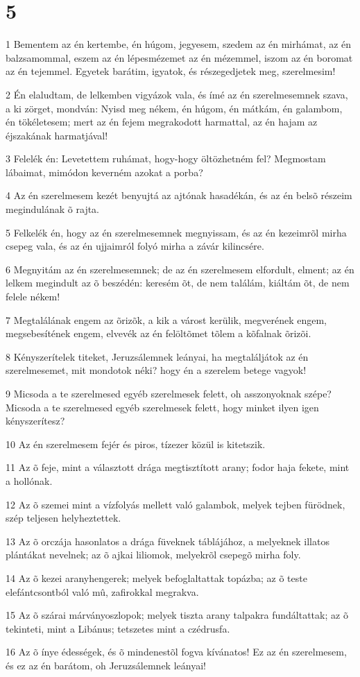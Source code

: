 \chapter{5}

\par 1 Bementem az én kertembe, én húgom, jegyesem, szedem az én mirhámat, az én balzsamommal, eszem az én lépesmézemet az én mézemmel, iszom az én boromat az én tejemmel. Egyetek barátim, igyatok, és részegedjetek meg, szerelmesim!
\par 2 Én elaludtam, de lelkemben vigyázok vala, és ímé az én szerelmesemnek szava, a ki zörget, mondván: Nyisd meg nékem, én húgom, én mátkám, én galambom, én tökéletesem; mert az én fejem megrakodott harmattal, az én hajam az éjszakának harmatjával!
\par 3 Felelék én: Levetettem ruhámat, hogy-hogy öltözhetném fel? Megmostam lábaimat, mimódon keverném azokat a porba?
\par 4 Az én szerelmesem kezét benyujtá az ajtónak hasadékán, és az én belsõ részeim megindulának õ rajta.
\par 5 Felkelék én, hogy az én szerelmesemnek megnyissam, és az én kezeimrõl mirha csepeg vala, és az én ujjaimról folyó mirha a závár kilincsére.
\par 6 Megnyitám az én szerelmesemnek; de az én szerelmesem elfordult, elment; az én lelkem megindult az õ beszédén: keresém õt, de nem találám, kiáltám õt, de nem felele nékem!
\par 7 Megtalálának engem az õrizõk, a kik a várost kerülik, megverének engem, megsebesítének engem, elvevék az én felöltõmet tõlem a kõfalnak õrizõi.
\par 8 Kényszerítelek titeket, Jeruzsálemnek leányai, ha megtaláljátok az én szerelmesemet, mit mondotok néki? hogy én a szerelem betege vagyok!
\par 9 Micsoda a te szerelmesed egyéb szerelmesek felett, oh asszonyoknak szépe? Micsoda a te szerelmesed egyéb szerelmesek felett, hogy minket ilyen igen kényszerítesz?
\par 10 Az én szerelmesem fejér és piros, tízezer közül is kitetszik.
\par 11 Az õ feje, mint a választott drága megtisztított arany; fodor haja fekete, mint a hollónak.
\par 12 Az õ szemei mint a vízfolyás mellett való galambok, melyek tejben fürödnek, szép teljesen helyheztettek.
\par 13 Az õ orczája hasonlatos a drága füveknek táblájához, a melyeknek illatos plántákat nevelnek; az õ ajkai liliomok, melyekrõl csepegõ mirha foly.
\par 14 Az õ kezei aranyhengerek; melyek befoglaltattak topázba; az õ teste elefántcsontból való mû, zafirokkal megrakva.
\par 15 Az õ szárai márványoszlopok; melyek tiszta arany talpakra fundáltattak; az õ tekinteti, mint a Libánus; tetszetes mint a czédrusfa.
\par 16 Az õ ínye édességek, és õ mindenestõl fogva kívánatos! Ez az én szerelmesem, és ez az én barátom, oh Jeruzsálemnek leányai!


